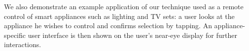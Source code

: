 We also demonstrate an example application of our technique used as a remote control of smart appliances such as lighting and TV sets: a user looks at the appliance he wishes to control and confirms selection by tapping. An appliance-specific user interface is then shown on the user's near-eye display for further interactions. 






